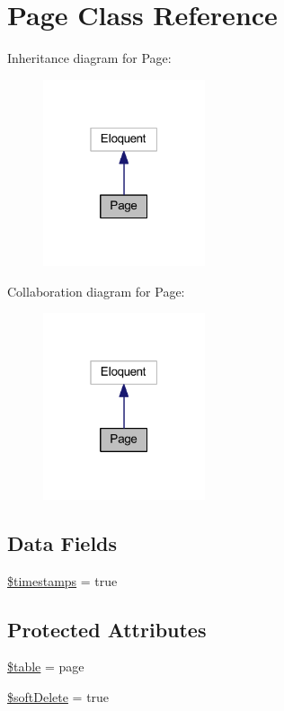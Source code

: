 \hypertarget{class_page}{}\section{Page Class Reference}
\label{class_page}


Inheritance diagram for Page\+:
\nopagebreak
\begin{figure}[H]
\begin{center}
\leavevmode
\includegraphics[width=135pt]{class_page__inherit__graph}
\end{center}
\end{figure}


Collaboration diagram for Page\+:
\nopagebreak
\begin{figure}[H]
\begin{center}
\leavevmode
\includegraphics[width=135pt]{class_page__coll__graph}
\end{center}
\end{figure}
\subsection*{Data Fields}
\begin{DoxyCompactItemize}
\item 
\hyperlink{class_page_a51267c24c8fae742ed8f9be0ba6085ee}{\$timestamps} = true
\end{DoxyCompactItemize}
\subsection*{Protected Attributes}
\begin{DoxyCompactItemize}
\item 
\hyperlink{class_page_ae8876a14058f368335baccf35af4a22b}{\$table} = \textquotesingle{}page\textquotesingle{}
\item 
\hyperlink{class_page_a4cc511ae1e6d03cb2310e93d18f409cd}{\$soft\+Delete} = true
\end{DoxyCompactItemize}


